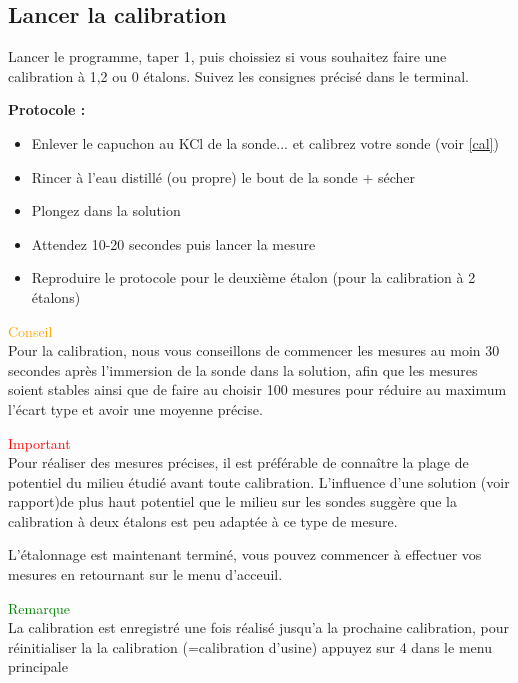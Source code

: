 \documentclass{ipgplicence}
\begin{document}
\subsection{Lancer la calibration}
Lancer le programme, taper 1, puis choissiez si vous souhaitez faire une calibration à 1,2 ou 0 étalons.
Suivez les consignes précisé dans le terminal. 

{\Large\textbf{Protocole :}}\\
\begin{itemize}
    \item Enlever le capuchon au KCl de la sonde... et calibrez votre sonde (voir \ref{cal})
    \item Rincer à l'eau distillé (ou propre) le bout de la sonde + sécher 
    \item Plongez dans la solution
    \item Attendez 10-20 secondes puis lancer la mesure
    \item Reproduire le protocole pour le deuxième étalon (pour la calibration à 2 étalons)
\end{itemize}
\begin{tcolorbox}[colback=gray!20, colframe=gray]
    {\Large\textcolor{orange}{Conseil}\\}
Pour la calibration, nous vous conseillons de commencer les mesures 
au moin 30 secondes après l'immersion de la sonde dans la solution, afin que les mesures soient stables ainsi
que de faire au choisir 100 mesures pour réduire au maximum l'écart type et avoir une moyenne précise.
\end{tcolorbox}
\begin{tcolorbox}[colback=gray!20, colframe=gray]
    {\Large\textcolor{red}{Important}\\}
Pour réaliser des mesures précises, il est préférable de connaître la plage de potentiel du milieu étudié avant 
toute calibration. L'influence d'une solution (voir rapport)de plus haut potentiel que le milieu sur les sondes 
suggère que la calibration à deux étalons est peu adaptée à ce type de mesure.
\end{tcolorbox}
L’étalonnage est maintenant terminé, vous pouvez commencer à effectuer vos mesures en retournant sur le menu d'acceuil.
\begin{tcolorbox}[colback=gray!20, colframe=gray]
    {\Large\textcolor{green}{Remarque}\\}
La calibration est enregistré une fois réalisé jusqu'a la prochaine calibration, pour réinitialiser la la calibration (=calibration d'usine)
appuyez sur 4 dans le menu principale
\end{tcolorbox}
\end{document}
